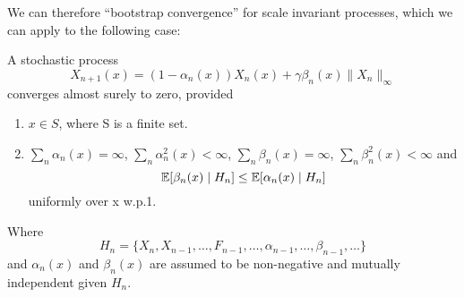 We can therefore ``bootstrap convergence'' for scale invariant processes, which we can apply to the following case:

\begin{lemma}
    A stochastic process
    \[
        X_{n+1}(x)=(1-\alpha_n(x))X_n(x)+\gamma\beta_n(x)\|X_n\|_\infty
    \]
    converges almost surely to zero, provided
    \begin{enumerate}
        \item \(x\in S\), where S is a finite set.
        \item \(\sum_n \alpha_n(x)=\infty\), \(\sum_n \alpha_n^2(x) <\infty\), \(\sum_n\beta_n(x)=\infty\), \(\sum_n \beta_n^2 (x)<\infty\) and
        \[
            \mathbb{E}[\beta_n(x)\mid H_n]\le \mathbb{E}[\alpha_n(x)\mid H_n]
        \]
        uniformly over x w.p.1.
    \end{enumerate}
    Where 
    \[
        H_n=\{X_n, X_{n-1}, \dots, F_{n-1}, \dots, \alpha_{n-1},\dots, \beta_{n-1},\dots\}
    \]
    and \(\alpha_n(x)\) and \(\beta_n(x)\) are assumed to be non-negative and mutually independent given \(H_n\).
\end{lemma}

